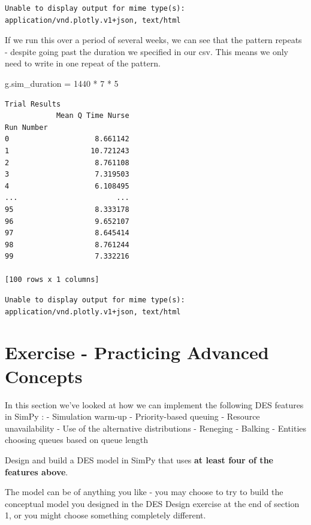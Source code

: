 \documentclass[
  letterpaper,
  DIV=11,
  numbers=noendperiod]{scrreprt}
\newenvironment{Shaded}{}{}
\newcommand{\DecValTok}[1]{\textcolor[rgb]{0.00,0.36,0.77}{#1}}
\newcommand{\NormalTok}[1]{\textcolor[rgb]{0.14,0.16,0.18}{#1}}
\newcommand{\OperatorTok}[1]{\textcolor[rgb]{0.14,0.16,0.18}{#1}}
\begin{document}
\begin{verbatim}
Unable to display output for mime type(s): application/vnd.plotly.v1+json, text/html
\end{verbatim}

If we run this over a period of several weeks, we can see that the
pattern repeats - despite going past the duration we specified in our
csv. This means we only need to write in one repeat of the pattern.

\begin{Shaded}
\begin{Highlighting}[]
\NormalTok{g.sim\_duration }\OperatorTok{=} \DecValTok{1440} \OperatorTok{*} \DecValTok{7} \OperatorTok{*} \DecValTok{5}
\end{Highlighting}
\end{Shaded}

\begin{verbatim}
Trial Results
            Mean Q Time Nurse
Run Number                   
0                    8.661142
1                   10.721243
2                    8.761108
3                    7.319503
4                    6.108495
...                       ...
95                   8.333178
96                   9.652107
97                   8.645414
98                   8.761244
99                   7.332216

[100 rows x 1 columns]
\end{verbatim}

\begin{verbatim}
Unable to display output for mime type(s): application/vnd.plotly.v1+json, text/html
\end{verbatim}

\chapter{Exercise - Practicing Advanced
Concepts}\label{exercise---practicing-advanced-concepts}

In this section we've looked at how we can implement the following DES
features in SimPy : - Simulation warm-up - Priority-based queuing -
Resource unavailability - Use of the alternative distributions -
Reneging - Balking - Entities choosing queues based on queue length

Design and build a DES model in SimPy that uses \textbf{at least four of
the features above}.

The model can be of anything you like - you may choose to try to build
the conceptual model you designed in the DES Design exercise at the end
of section 1, or you might choose something completely different.
\end{document}
